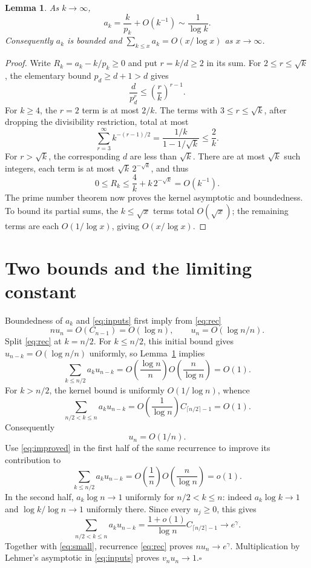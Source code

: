 \documentclass[11pt]{article}
\newtheorem{lemma}{Lemma}
\begin{document}
\begin{lemma}\label{lem:kernel}
As $k\to\infty$,
\[
 a_k=\frac{k}{p_k}+O(k^{-1})\sim\frac1{\log k}.
\]
Consequently $a_k$ is bounded and
$\sum_{k\le x}a_k=O(x/\log x)$ as $x\to\infty$.
\end{lemma}
\begin{proof}
Write $R_k=a_k-k/p_k\ge0$ and put $r=k/d\ge2$ in its sum.
For $2\le r\le\sqrt k$, the elementary bound $p_d\ge d+1>d$ gives
\[
 \frac{d}{p_d^r}\le\left(\frac{r}{k}\right)^{r-1}.
\]
For $k\ge4$, the $r=2$ term is at most $2/k$. The terms with
$3\le r\le\sqrt k$, after dropping the divisibility restriction, total at most
\[
 \sum_{r=3}^\infty k^{-(r-1)/2}
   =\frac{1/k}{1-1/\sqrt k}\le\frac2k.
\]
For $r>\sqrt k$, the corresponding $d$ are less than $\sqrt k$.
There are at most $\sqrt k$ such integers, each term is at most
$\sqrt k\,2^{-\sqrt k}$, and thus
\begin{equation}\label{eq:R}
 0\le R_k\le\frac4k+k\,2^{-\sqrt k}=O(k^{-1}).
\end{equation}
The prime number theorem now proves the kernel asymptotic and boundedness.
To bound its partial sums, the $k\le\sqrt x$ terms total $O(\sqrt x)$;
the remaining terms are each $O(1/\log x)$, giving $O(x/\log x)$.
\end{proof}

\section*{Two bounds and the limiting constant}
Boundedness of $a_k$ and \eqref{eq:inputs} first imply from \eqref{eq:rec}
\[
 nu_n=O(C_{n-1})=O(\log n),\qquad u_n=O(\log n/n).
\]
Split \eqref{eq:rec} at $k=n/2$. For $k\le n/2$, this initial bound gives
$u_{n-k}=O(\log n/n)$ uniformly, so Lemma~\ref{lem:kernel} implies
\[
 \sum_{k\le n/2}a_ku_{n-k}
 =O\left(\frac{\log n}{n}\right)
  O\left(\frac n{\log n}\right)=O(1).
\]
For $k>n/2$, the kernel bound is uniformly $O(1/\log n)$, whence
\[
 \sum_{n/2<k\le n}a_ku_{n-k}
 =O\left(\frac1{\log n}\right)C_{\lceil n/2\rceil-1}=O(1).
\]
Consequently
\begin{equation}\label{eq:improved}
                              u_n=O(1/n).
\end{equation}
Use \eqref{eq:improved} in the first half of the same recurrence to improve
its contribution to
\begin{equation}\label{eq:small}
 \sum_{k\le n/2}a_ku_{n-k}
 =O\left(\frac1n\right)O\left(\frac n{\log n}\right)=o(1).
\end{equation}
In the second half, $a_k\log n\to1$ uniformly for $n/2<k\le n$:
indeed $a_k\log k\to1$ and $\log k/\log n\to1$ uniformly there.
Since every $u_j\ge0$, this gives
\[
 \sum_{n/2<k\le n}a_ku_{n-k}
 =\frac{1+o(1)}{\log n}C_{\lceil n/2\rceil-1}
 \longrightarrow e^\gamma.
\]
Together with \eqref{eq:small}, recurrence \eqref{eq:rec} proves
$nu_n\to e^\gamma$. Multiplication by Lehmer's asymptotic in
\eqref{eq:inputs} proves $v_nu_n\to1$.\hfill$\square$
\end{document}
